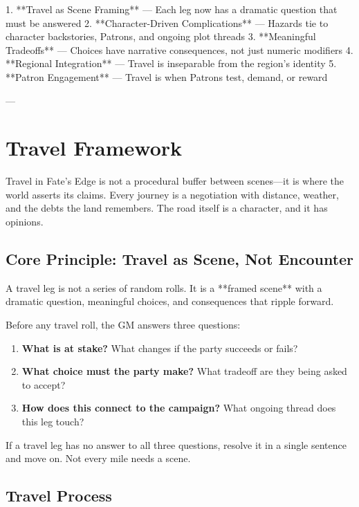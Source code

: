 1. **Travel as Scene Framing** — Each leg now has a dramatic question that must be answered
2. **Character-Driven Complications** — Hazards tie to character backstories, Patrons, and ongoing plot threads
3. **Meaningful Tradeoffs** — Choices have narrative consequences, not just numeric modifiers
4. **Regional Integration** — Travel is inseparable from the region's identity
5. **Patron Engagement** — Travel is when Patrons test, demand, or reward

---

\section{Travel Framework}
\label{sec:travel-framework}

Travel in Fate's Edge is not a procedural buffer between scenes—it is where the world asserts its claims. Every journey is a negotiation with distance, weather, and the debts the land remembers. The road itself is a character, and it has opinions.

\subsection*{Core Principle: Travel as Scene, Not Encounter}
\label{sec:travel-core}

A travel leg is not a series of random rolls. It is a **framed scene** with a dramatic question, meaningful choices, and consequences that ripple forward.

Before any travel roll, the GM answers three questions:

\begin{enumerate}
\item \textbf{What is at stake?} What changes if the party succeeds or fails?
\item \textbf{What choice must the party make?} What tradeoff are they being asked to accept?
\item \textbf{How does this connect to the campaign?} What ongoing thread does this leg touch?
\end{enumerate}

If a travel leg has no answer to all three questions, resolve it in a single sentence and move on. Not every mile needs a scene.

\subsection*{Travel Process}
\label{sec:travel-process}

